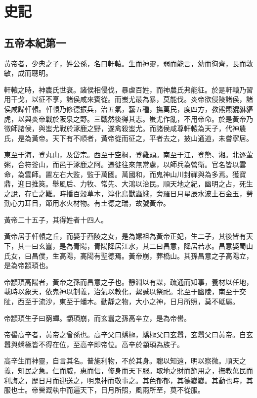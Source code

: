 \documentclass[twocolumn]{cvertbook}
\begin{document}
\tableofparts

\tableofcontents

\part{史記}

\chapter{五帝本紀第一}

黃帝者，少典之子，姓公孫，名曰軒轅。生而神靈，弱而能言，幼而徇齊，長而敦敏，成而聰明。

軒轅之時，神農氏世衰。諸侯相侵伐，暴虐百姓，而神農氏弗能征。於是軒轅乃習用干戈，以征不享，諸侯咸來賓從。而蚩尤最為暴，莫能伐。炎帝欲侵陵諸侯，諸侯咸歸軒轅。軒轅乃修德振兵，治五氣，藝五種，撫萬民，度四方，教熊羆貔貅貙虎，以與炎帝戰於阪泉之野。三戰然後得其志。蚩尤作亂，不用帝命。於是黃帝乃徵師諸侯，與蚩尤戰於涿鹿之野，遂禽殺蚩尤。而諸侯咸尊軒轅為天子，代神農氏，是為黃帝。天下有不順者，黃帝從而征之，平者去之，披山通道，未嘗寧居。

東至于海，登丸山，及岱宗。西至于空桐，登雞頭。南至于江，登熊、湘。北逐葷粥，合符釜山，而邑于涿鹿之阿。遷徙往來無常處，以師兵為營衛。官名皆以雲命，為雲師。置左右大監，監于萬國。萬國和，而鬼神山川封禪與為多焉。獲寶鼎，迎日推筴。舉風后、力牧、常先、大鴻以治民。順天地之紀，幽明之占，死生之說，存亡之難。時播百穀草木，淳化鳥獸蟲蛾，旁羅日月星辰水波土石金玉，勞勤心力耳目，節用水火材物。有土德之瑞，故號黃帝。

黃帝二十五子，其得姓者十四人。

黃帝居于軒轅之丘，而娶于西陵之女，是為嫘祖為黃帝正妃，生二子，其後皆有天下，其一曰玄囂，是為青陽，青陽降居江水，其二曰昌意，降居若水。昌意娶蜀山氏女，曰昌僕，生高陽，高陽有聖德焉。黃帝崩，葬橋山。其孫昌意之子高陽立，是為帝顓頊也。

帝顓頊高陽者，黃帝之孫而昌意之子也。靜淵以有謀，疏通而知事，養材以任地，載時以象天，依鬼神以制義，治氣以教化，絜誠以祭祀。北至于幽陵，南至于交阯，西至于流沙，東至于蟠木。動靜之物，大小之神，日月所照，莫不砥屬。

帝顓頊生子曰窮蟬。顓頊崩，而玄囂之孫高辛立，是為帝嚳。

帝嚳高辛者，黃帝之曾孫也。高辛父曰蟜極，蟜極父曰玄囂，玄囂父曰黃帝。自玄囂與蟜極皆不得在位，至高辛即帝位。高辛於顓頊為族子。

高辛生而神靈，自言其名。普施利物，不於其身。聰以知遠，明以察微。順天之義，知民之急。仁而威，惠而信，修身而天下服。取地之財而節用之，撫教萬民而利誨之，歷日月而迎送之，明鬼神而敬事之。其色郁郁，其德嶷嶷。其動也時，其服也士。帝嚳溉執中而遍天下，日月所照，風雨所至，莫不從服。
\end{document}

